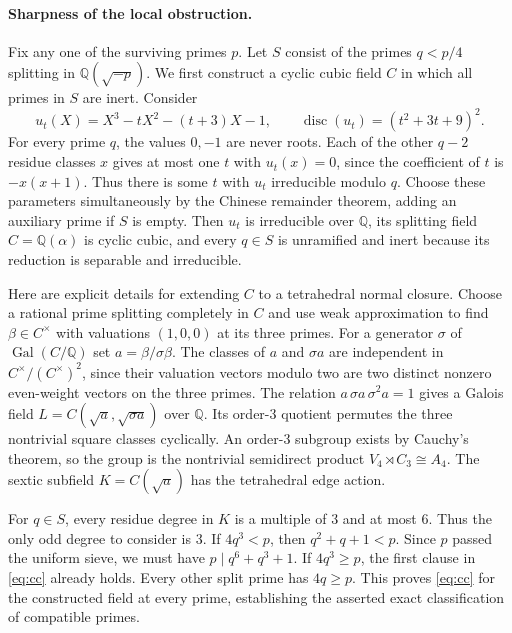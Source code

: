 \paragraph{Sharpness of the local obstruction.}
Fix any one of the surviving primes $p$. Let $S$ consist of the primes
$q<p/4$ splitting in $\mathbb Q(\sqrt{-p})$. We first construct a cyclic
cubic field $C$ in which all primes in $S$ are inert. Consider
\[
 u_t(X)=X^3-tX^2-(t+3)X-1,\qquad
 \operatorname{disc}(u_t)=(t^2+3t+9)^2.
\]
For every prime $q$, the values $0,-1$ are never roots. Each of the other
$q-2$ residue classes $x$ gives at most one $t$ with $u_t(x)=0$,
since the coefficient of $t$ is $-x(x+1)$. Thus there is some $t$ with
$u_t$ irreducible modulo $q$. Choose these parameters simultaneously
by the Chinese remainder theorem, adding an auxiliary prime if $S$ is
empty. Then $u_t$ is irreducible over $\mathbb Q$, its splitting field
$C=\mathbb Q(\alpha)$ is cyclic cubic, and every $q\in S$ is unramified
and inert because its reduction is separable and irreducible.

Here are explicit details for extending $C$ to a tetrahedral normal
closure. Choose a rational prime splitting completely in $C$ and use
weak approximation to find $\beta\in C^\times$ with valuations $(1,0,0)$
at its three primes. For a generator $\sigma$ of
$\operatorname{Gal}(C/\mathbb Q)$ set $a=\beta/\sigma\beta$.
The classes of $a$ and $\sigma a$ are independent in
$C^\times/(C^\times)^2$, since their valuation vectors modulo two are
two distinct nonzero even-weight vectors on the three primes.
The relation $a\,\sigma a\,\sigma^2 a=1$ gives a Galois field
$L=C(\sqrt a,\sqrt{\sigma a})$ over $\mathbb Q$. Its order-$3$ quotient
permutes the three nontrivial square classes cyclically. An order-$3$
subgroup exists by Cauchy's theorem, so the group is the nontrivial
semidirect product $V_4\rtimes C_3\cong A_4$. The sextic subfield
$K=C(\sqrt a)$ has the tetrahedral edge action.

For $q\in S$, every residue degree in $K$ is a multiple of $3$ and at
most $6$. Thus the only odd degree to consider is $3$. If $4q^3<p$,
then $q^2+q+1<p$. Since $p$ passed the uniform sieve, we must have
$p\mid q^6+q^3+1$. If $4q^3\ge p$, the first clause in
\eqref{eq:cc} already holds. Every other split prime has $4q\ge p$.
This proves \eqref{eq:cc} for the constructed field at every prime,
establishing the asserted exact classification of compatible primes.

